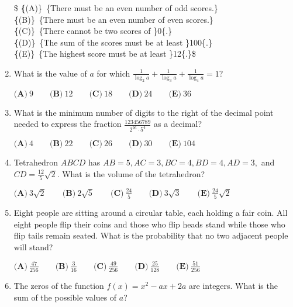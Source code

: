 \documentclass{article}
\begin{document}
\begin{enumerate}[label=\arabic*., itemsep=0.5em]
\$ \textbf\{(A)\}\ \text\{There must be an even number of odd scores.\}\\
\qquad\textbf\{(B)\}\ \text\{There must be an even number of even scores.\}\\
\qquad\textbf\{(C)\}\ \text\{There cannot be two scores of \}0\text\{.\}\\
\qquad\textbf\{(D)\}\ \text\{The sum of the scores must be at least \}100\text\{.\}\\
\qquad\textbf\{(E)\}\ \text\{The highest score must be at least \}12\text\{.\}\$\par \vspace{0.5em}\item What is the value of $a$ for which $\frac{1}{\log_2 a} + \frac{1}{\log_3 a} + \frac{1}{\log_4 a} = 1$?

$\textbf{(A)}\ 9\qquad\textbf{(B)}\ 12\qquad\textbf{(C)}\ 18\qquad\textbf{(D)}\ 24\qquad\textbf{(E)}\ 36$\par \vspace{0.5em}\item What is the minimum number of digits to the right of the decimal point needed to express the fraction $\frac{123456789}{2^{26}\cdot 5^4}$ as a decimal?

$ \textbf{(A)}\ 4\qquad\textbf{(B)}\ 22\qquad\textbf{(C)}\ 26\qquad\textbf{(D)}\ 30\qquad\textbf{(E)}\ 104$\par \vspace{0.5em}\item Tetrahedron $ABCD$ has $AB=5,AC=3,BC=4,BD=4,AD=3,$ and $CD=\frac{12}{5}\sqrt{2}$. What is the volume of the tetrahedron?

$ \textbf{(A)}\ 3\sqrt{2}\qquad\textbf{(B)}\ 2\sqrt{5}\qquad\textbf{(C)}\ \frac{24}{5}\qquad\textbf{(D)}\ 3\sqrt{3}\qquad\textbf{(E)}\ \frac{24}{5}\sqrt{2}$\par \vspace{0.5em}\item Eight people are sitting around a circular table, each holding a fair coin. All eight people flip their coins and those who flip heads stand while those who flip tails remain seated. What is the probability that no two adjacent people will stand?

$ \textbf{(A)}\ \frac{47}{256} \qquad\textbf{(B)}\ \frac{3}{16} \qquad\textbf{(C)}\ \frac{49}{256} \qquad\textbf{(D)}\ \frac{25}{128} \qquad\textbf{(E)}\ \frac{51}{256}$\par \vspace{0.5em}\item The zeros of the function $f(x) = x^2-ax+2a$ are integers. What is the sum of the possible values of $a$?


\end{enumerate}
\end{document}
